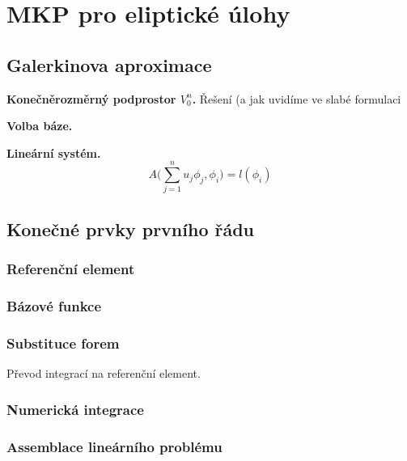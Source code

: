 

\section{MKP pro eliptické úlohy}
\subsection{Galerkinova aproximace}
{\bf Konečněrozměrný podprostor $V_0^n$.} Řešení (a jak uvidíme ve slabé formulaci

{\bf Volba báze.}

{\bf Lineární systém.}
\[
 A\Big(\sum_{j=1}^n u_j\phi_j, \phi_i\Big) = l(\phi_i)
\]


\subsection{Konečné prvky prvního řádu}
\subsubsection{Referenční element}
\subsubsection{Bázové funkce}
\subsubsection{Substituce forem}
Převod integrací na referenční element.
\subsubsection{Numerická integrace}
\subsubsection{Assemblace lineárního problému}
